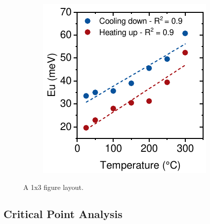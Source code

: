 \begin{figure}[htbp]
\begin{subfigure}{0.32\textwidth}
        \caption{}
        \label{fig:ellipsometry:urbach_cooling}
    \end{subfigure}
    \hfill
    \begin{subfigure}{0.3\textwidth}
        \includegraphics[width=\textwidth]{chapters/ellipsometry/image/Urbach_temp.pdf}
        \caption{}
        \label{fig:ellipsometry:urbach_temp}
    \end{subfigure}
    \caption{A 1x3 figure layout.}
    \label{fig:ellipsometry:urbach}
\end{figure}


\subsection{Critical Point Analysis}


